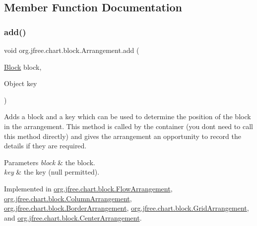 \subsection{Member Function Documentation}
\mbox{\label{interfaceorg_1_1jfree_1_1chart_1_1block_1_1_arrangement_ab9ba94da0c30233584985ff29d88b489}} 
\subsubsection{\texorpdfstring{add()}{add()}}
{\footnotesize\ttfamily void org.\+jfree.\+chart.\+block.\+Arrangement.\+add (\begin{DoxyParamCaption}\item[{\mbox{\hyperlink{interfaceorg_1_1jfree_1_1chart_1_1block_1_1_block}{Block}}}]{block,  }\item[{Object}]{key }\end{DoxyParamCaption})}

Adds a block and a key which can be used to determine the position of the block in the arrangement. This method is called by the container (you don\textquotesingle{}t need to call this method directly) and gives the arrangement an opportunity to record the details if they are required.


\begin{DoxyParams}{Parameters}
{\em block} & the block. \\
\hline
{\em key} & the key ({\ttfamily null} permitted). \\
\hline
\end{DoxyParams}


Implemented in \mbox{\hyperlink{classorg_1_1jfree_1_1chart_1_1block_1_1_flow_arrangement_aad51f7ee101f3ba0732e5b72be1992eb}{org.\+jfree.\+chart.\+block.\+Flow\+Arrangement}}, \mbox{\hyperlink{classorg_1_1jfree_1_1chart_1_1block_1_1_column_arrangement_aaf6f65ef1134e5ce76c842c49a047294}{org.\+jfree.\+chart.\+block.\+Column\+Arrangement}}, \mbox{\hyperlink{classorg_1_1jfree_1_1chart_1_1block_1_1_border_arrangement_a37647c2dba63b5085a9005fbbd060d6f}{org.\+jfree.\+chart.\+block.\+Border\+Arrangement}}, \mbox{\hyperlink{classorg_1_1jfree_1_1chart_1_1block_1_1_grid_arrangement_a5ca7b468aa027c0d09752ee8fa9c33af}{org.\+jfree.\+chart.\+block.\+Grid\+Arrangement}}, and \mbox{\hyperlink{classorg_1_1jfree_1_1chart_1_1block_1_1_center_arrangement_a4de4c495b559a726ab4cff17f154ab81}{org.\+jfree.\+chart.\+block.\+Center\+Arrangement}}.

